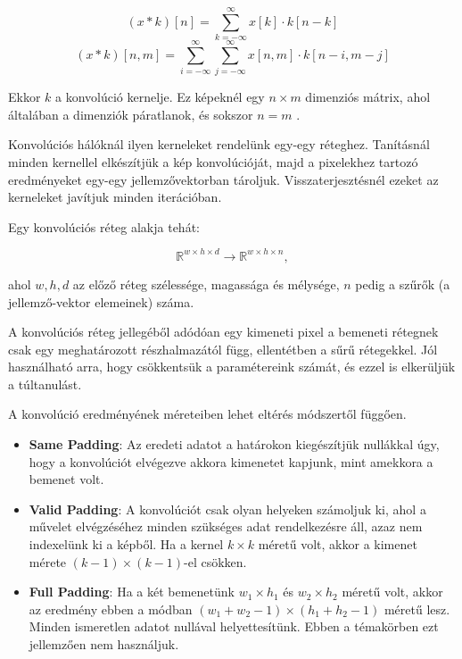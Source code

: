 \[  (x*k)[n] =  \sum\limits_{k=-\infty}^{\infty} x[k] \cdot k[n-k]  \]
\[  (x*k)[n, m] =  
\sum\limits_{i=-\infty}^{\infty} 
\sum\limits_{j=-\infty}^{\infty} 
x[n, m] \cdot k[n-i, m-j]  \]


Ekkor $ k $ a konvolúció kernelje. Ez képeknél egy $ n \times m $ dimenziós mátrix, ahol általában a dimenziók páratlanok, és sokszor $ n = m $ .


Konvolúciós hálóknál ilyen kerneleket rendelünk egy-egy réteghez.
Tanításnál minden kernellel elkészítjük a kép konvolúcióját,
majd a pixelekhez tartozó eredményeket egy-egy jellemzővektorban tároljuk.
Visszaterjesztésnél ezeket az kerneleket javítjuk minden iterációban.

\noindent
Egy konvolúciós réteg alakja tehát:

\[  \mathbb{R}^{w \times h \times d} \rightarrow \mathbb{R}^{w \times h \times n} , \]

\noindent
ahol $ w, h,d $ az előző réteg szélessége, magassága és mélysége, 
$ n $ pedig a szűrők (a jellemző-vektor elemeinek) száma.

A konvolúciós réteg jellegéből adódóan egy kimeneti pixel a bemeneti rétegnek csak egy meghatározott részhalmazától függ, ellentétben a sűrű rétegekkel. Jól használható arra, hogy csökkentsük a paramétereink számát, és ezzel is elkerüljük a túltanulást.



A konvolúció eredményének méreteiben lehet eltérés módszertől függően. 

\begin{itemize}
	\item 
	\textbf{Same Padding}: Az eredeti adatot a határokon kiegészítjük nullákkal úgy, hogy a konvolúciót elvégezve akkora kimenetet kapjunk, mint amekkora a bemenet volt.
	
	\item 
	\textbf{Valid Padding}: A konvolúciót csak olyan helyeken számoljuk ki, ahol a művelet elvégzéséhez minden szükséges adat rendelkezésre áll, azaz nem indexelünk ki a képből. Ha a kernel $ k \times k $ méretű volt, akkor a kimenet mérete $ (k-1) \times (k-1) $-el csökken.
	
	\item 
	\textbf{Full Padding}: Ha a két bemenetünk $ w_1 \times h_1 $ és $ w_2 \times h_2 $ méretű volt, akkor az eredmény ebben a módban $ (w_1 + w_2 - 1) \times (h_1 + h_2 - 1) $ méretű lesz. Minden ismeretlen adatot nullával helyettesítünk. Ebben a témakörben ezt jellemzően nem használjuk.
	
\end{itemize}


